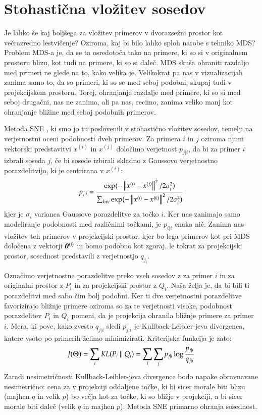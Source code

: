 \section{Stohastična vložitev sosedov}

Je lahko še kaj boljšega za vložitev primerov v dvorazsežni prostor kot večrazredno lestvičenje? Oziroma, kaj bi bilo lahko sploh narobe s tehniko MDS? Problem MDS-a je, da se ta osredotoča tako na primere, ki so si v originalnem prostoru blizu, kot tudi na primere, ki so si daleč. MDS skuša ohraniti razdaljo med primeri ne glede na to, kako velika je. Velikokrat pa nas v vizualizacijah zanima samo to, da so primeri, ki so se med seboj podobni, skupaj tudi v projekcijskem prostoru. Torej, ohranjanje razdalje med primere, ki so si med seboj drugačni, nas ne zanima, ali pa nas, recimo, zanima veliko manj kot ohranjanje bližine med seboj podobnih primerov.

Metoda SNE , ki smo jo tu poslovenili v stohastično vložitev sosedov, temelji na verjetnostni oceni podobnosti dveh primerov. Za primera $i$ in $j$ oziroma njuni vektorski predstavitvi $x^{(i)}$ in $x^{(j)}$ določimo verjetnost $p_{j|i}$, da bi za primer $i$ izbrali soseda $j$, če bi sosede izbirali skladno z Gaussovo verjetnostno porazdelitvijo, ki je centrirana v $x^{(i)}$:
\begin{equation}
  p_{j|i}=\frac{\exp(-\left\lVert x^{(i)}-x^{(j)}\right\rVert^2/2\sigma_i^2)}
  {\sum_{k\neq i}\exp(-\left\lVert x^{(i)}-x^{(k)}\right\rVert^2/2\sigma_i^2)}
\end{equation}
kjer je $\sigma_i$ varianca Gaussove porazdelitve za točko $i$. Ker nas zanimajo samo modeliranje podobnosti med različnimi točkami, je $p_{i|i}$ enaka nič. Zanima nas vložitev teh primerov v projekcijski prostor, kjer bo lega primerov kot pri MDS določena z vektorji $\boldsymbol{\theta}^{(i)}$ in bomo podobno kot zgoraj, le tokrat za projekcijski prostor, sosednost predstavili z verjetnostjo $q_{j_i}$.

Označimo verjetnostne porazdelitve preko vseh sosedov z za primer $i$ in za originalni prostor z $P_i$ in za projekcijski prostor z $Q_i$. Naša želja je, da bi bili ti porazdelitvi med sabo čim bolj podobni. Ker ti dve verjetnostni porazdelitve favorizirajo bližnje primere oziroma so za te verjetnosti visoke, podobnost porazdelitev $P_i$ in $Q_i$ pomeni, da je projekcija ohranila bližnje primere za primer $i$. Mera, ki pove, kako zvesto $q_{j|i}$ sledi $p_{j|i}$ je Kullback-Leibler-jeva divergenca, katere vsoto po primerih želimo minimizirati. Kriterijska funkcija je zato:
\begin{equation}
  J(\vect{\Theta}) = \sum_i KL(P_i\ ||\ Q_i)=\sum_i\sum_j p_{j|i}\log\frac{p_{j|i}}{q_{j|i}}
\end{equation}
Zaradi nesimetričnosti Kullback-Leibler-jeva divergence bodo napake obravnavane nesimetrično: cena za v projekciji oddaljene točke, ki bi sicer morale biti blizu (majhen $q$ in velik $p$) bo večja kot za točke, ki so bližje v projekciji, a bi sicer morale biti daleč (velik $q$ in majhen $p$). Metoda SNE primarno ohranja sosednost.

